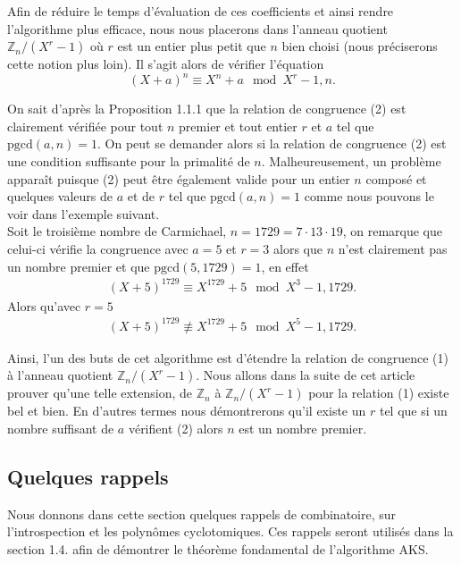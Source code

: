 \documentclass[11pt]{article}
\newcommand{\pgcd}{\mathrm{pgcd}}
\begin{document}
Afin de réduire le temps d'évaluation de ces coefficients et ainsi rendre l'algorithme plus efficace, nous nous placerons dans l'anneau quotient $\mathbb{Z}_{n}/(X^r-1)$ où $r$ est un entier plus petit que $n$ bien choisi (nous préciserons cette notion plus loin). Il s'agit alors de vérifier l'équation
\begin{equation}
(X+a)^n \equiv X^n+a \mod X^r-1,n.
\end{equation}

On sait d'après la Proposition 1.1.1 que la relation de congruence (2) est clairement vérifiée pour tout $n$ premier et tout entier $r$ et $a$ tel que $\pgcd(a,n)=1$. On peut se demander alors si la relation de congruence (2) est une condition suffisante pour la primalité de $n$. Malheureusement, un problème apparaît puisque (2) peut être également valide pour un entier $n$ composé et quelques valeurs de $a$ et de $r$ tel que $\pgcd(a,n)=1$ comme nous pouvons le voir dans l'exemple suivant.\\

Soit le troisième nombre de Carmichael, $n=1729=7 \cdot 13 \cdot 19$, on remarque que celui-ci vérifie la congruence avec $a=5$ et $r=3$ alors que $n$ n'est clairement pas un nombre premier et que $\pgcd(5,1729)=1$, en effet
\begin{align*}
(X+5)^{1729} \equiv X^{1729}+5 \mod X^3-1,1729.
\end{align*}
Alors qu'avec $r=5$
\begin{align*}
(X+5)^{1729} \not\equiv X^{1729}+5 \mod X^5-1,1729.
\end{align*}

Ainsi, l'un des buts de cet algorithme est d'étendre la relation de congruence (1) à l'anneau quotient $\mathbb{Z}_{n}/(X^r-1)$. Nous allons dans la suite de cet article prouver qu'une telle extension, de $\mathbb{Z}_{n}$ à $\mathbb{Z}_{n}/(X^r-1)$ pour la relation (1) existe bel et bien. En d'autres termes nous démontrerons qu'il existe un $r$ tel que si un nombre suffisant de $a$ vérifient (2) alors $n$ est un nombre premier.\\

\subsection{Quelques rappels}

Nous donnons dans cette section quelques rappels de combinatoire, sur l'introspection et les polynômes cyclotomiques. Ces rappels seront utilisés dans la section 1.4. afin de démontrer le théorème fondamental de l'algorithme AKS.
\end{document}
